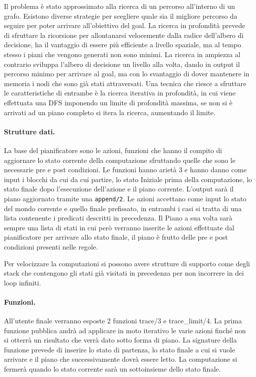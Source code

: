\documentclass[12pt,twoside]{report}
\begin{document}
Il problema è stato approssimato alla ricerca di un percorso all'interno di un grafo.
Esistono diverse strategie per scegliere quale sia il migliore percorso da seguire per poter arrivare all'obiettivo del goal. La ricerca in profondità prevede di sfruttare la ricorsione per allontanarsi velocemente dalla radice dell'albero di decisione, ha il vantaggio di essere più efficiente a livello spaziale, ma al tempo stesso i piani che vengono generati non sono minimi.
La ricerca in ampiezza al contrario sviluppa l'albero di decisione un livello alla volta, dando in output il percorso minimo per arrivare al goal, ma con lo svantaggio di dover mantenere in memoria i nodi che sono già stati attraversati.
Una tecnica che riesce a sfruttare le caratteristiche di entrambe è la ricerca iterativa in profondità, in cui viene effettuata una DFS imponendo un limite di profondità massima, se non si è arrivati ad un piano completo si itera la ricerca, aumentando il limite.

\paragraph{Strutture dati.} La base del pianificatore sono le azioni, funzioni che hanno il compito di aggiornare lo stato corrente della computazione sfruttando quelle che sono le necessarie pre e post condizioni. Le funzioni hanno arietà 3 e hanno danno come input i blocchi da cui da cui partire, lo stato Iniziale prima della computazione, lo stato finale dopo l'esecuzione dell'azione e il piano corrente. L'output sarà il piano aggiornato tramite una \texttt{append/2}.
Le azioni accettano come input lo stato del mondo corrente e quello finale prefissato, in entrambi i casi si tratta di una lista contenente i predicati descritti in precedenza.
Il Piano a sua volta sarà sempre una lista di stati in cui però verranno inserite le azioni effettuate dal pianificatore per arrivare allo stato finale, il piano è frutto delle pre e post condizioni presenti nelle regole.

Per velocizzare la computazioni si possono avere strutture di supporto come degli stack che contengono gli stati già visitati in precedenza per non incorrere in dei loop infiniti.

\paragraph{Funzioni.} All'utente finale verranno esposte 2 funzioni trace/3 e trace\_limit/4. La prima funzione pubblica andrà ad applicare in moto iterativo le varie azioni finché non si otterrà un risultato che verrà dato sotto forma di piano. La signature della funzione prevede di inserire lo stato di partenza, lo stato finale a cui si vuole arrivare e il piano che successivamente dovrà essere letto. La computazione si fermerà quando lo stato corrente sarà un sottoinsieme dello stato finale.
\end{document}
